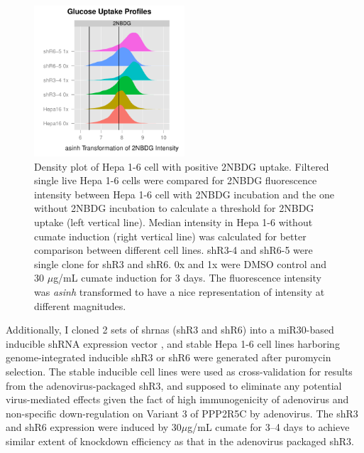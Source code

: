 \begin{figure}
\centering
\includegraphics[width=0.5\textwidth]{figs/fig2-13 density 2NBDG.pdf}
\caption[Density plot of 2NBDG+ Hepa 1-6]{\footnotesize Density plot of Hepa 1-6 cell with positive 2NBDG uptake. Filtered single live Hepa 1-6 cells were compared for 2NBDG fluorescence intensity between Hepa 1-6 cell with 2NBDG incubation and the one without 2NBDG incubation to calculate a threshold for 2NBDG uptake (left vertical line). Median intensity in Hepa 1-6 without cumate induction (right vertical line) was calculated for better comparison between different cell lines. shR3-4 and shR6-5 were single clone for shR3 and shR6. 0x and 1x were DMSO control and 30 $\mu$g/mL cumate induction for 3 days. The fluorescence intensity was \textit{asinh} transformed to have a nice representation of intensity at different magnitudes.}
\label{fig:fig2.13}
\end{figure}

Additionally, I cloned 2 sets of \gls{shrna}s (shR3 and shR6)  into a miR30-based inducible shRNA expression vector \cite{fellmann_functional_2011,_piggybac_????}, and stable Hepa 1-6 cell lines harboring genome-integrated inducible shR3 or shR6 were generated after puromycin selection. The stable inducible cell lines were used as cross-validation for results from the adenovirus-packaged shR3, and supposed to eliminate any potential virus-mediated effects given the fact of high immunogenicity of adenovirus and non-specific down-regulation on Variant 3 of PPP2R5C by adenovirus. The shR3 and shR6 expression were induced by 30$\mu$g/mL cumate for 3--4 days to achieve similar extent of knockdown efficiency as that in the adenovirus packaged shR3.

